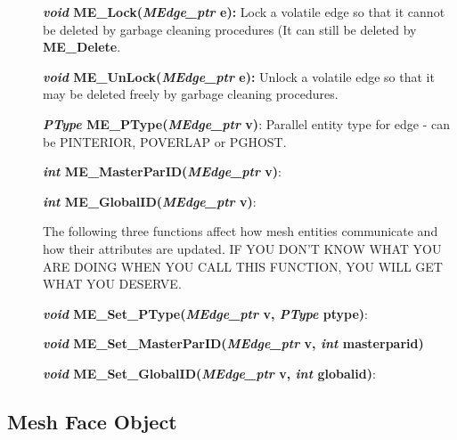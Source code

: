 \documentclass[12pt]{article}
\begin{document}
\begin{description}
\item[]

\item[]{\bf {\em void} ME\_Lock({\em MEdge\_ptr} e):} Lock a volatile
  edge so that it cannot be deleted by garbage cleaning procedures (It
  can still be deleted by {\bf ME\_Delete}.

\item[]{\bf {\em void} ME\_UnLock({\em MEdge\_ptr} e):} Unlock a volatile
  edge so that it may be deleted freely by garbage cleaning procedures.

\item[]

\item[]  {\bf {\em PType} ME\_PType({\em MEdge\_ptr} v)}: Parallel entity type for edge - can be PINTERIOR, POVERLAP or PGHOST.
\item[]  {\bf {\em int}   ME\_MasterParID({\em MEdge\_ptr} v)}:
\item[]  {\bf {\em int}   ME\_GlobalID({\em MEdge\_ptr} v)}:

\item[]
\item[]  The following three functions affect how mesh entities communicate and how their attributes are updated. IF YOU DON'T KNOW WHAT YOU ARE DOING WHEN YOU CALL THIS FUNCTION, YOU WILL GET WHAT YOU DESERVE.
\item[]  {\bf {\em void}  ME\_Set\_PType({\em MEdge\_ptr} v, {\em PType} ptype)}: 
\item[]  {\bf {\em void}  ME\_Set\_MasterParID({\em MEdge\_ptr} v, {\em int} masterparid)}
\item[]  {\bf {\em void}  ME\_Set\_GlobalID({\em MEdge\_ptr} v, {\em int} globalid)}:  


\end{description}



\newpage
\subsection{Mesh Face Object}
\end{document}
